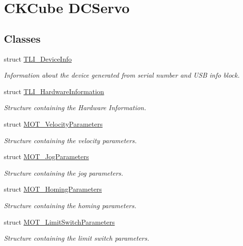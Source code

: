 \hypertarget{group___k_cube_d_c_servo}{}\section{C\+K\+Cube D\+C\+Servo}
\label{group___k_cube_d_c_servo}
\subsection*{Classes}
\begin{DoxyCompactItemize}
\item 
struct \hyperlink{struct_t_l_i___device_info}{T\+L\+I\+\_\+\+Device\+Info}
\begin{DoxyCompactList}\small\item\em Information about the device generated from serial number and U\+SB info block. \end{DoxyCompactList}\item 
struct \hyperlink{struct_t_l_i___hardware_information}{T\+L\+I\+\_\+\+Hardware\+Information}
\begin{DoxyCompactList}\small\item\em Structure containing the Hardware Information. \end{DoxyCompactList}\item 
struct \hyperlink{struct_m_o_t___velocity_parameters}{M\+O\+T\+\_\+\+Velocity\+Parameters}
\begin{DoxyCompactList}\small\item\em Structure containing the velocity parameters. \end{DoxyCompactList}\item 
struct \hyperlink{struct_m_o_t___jog_parameters}{M\+O\+T\+\_\+\+Jog\+Parameters}
\begin{DoxyCompactList}\small\item\em Structure containing the jog parameters. \end{DoxyCompactList}\item 
struct \hyperlink{struct_m_o_t___homing_parameters}{M\+O\+T\+\_\+\+Homing\+Parameters}
\begin{DoxyCompactList}\small\item\em Structure containing the homing parameters. \end{DoxyCompactList}\item 
struct \hyperlink{struct_m_o_t___limit_switch_parameters}{M\+O\+T\+\_\+\+Limit\+Switch\+Parameters}
\begin{DoxyCompactList}\small\item\em Structure containing the limit switch parameters. \end{DoxyCompactList}\item 

\end{DoxyCompactItemize}
